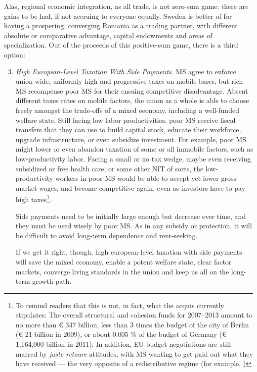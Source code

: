 Alas, regional economic integration, as all trade, is not zero-sum game: there are gains to be had, if not accruing to everyone equally. Sweden is better of for having a prospering, converging Romania as a trading partner, with different absolute or comparative advantage, capital endowments and areas of specialization. Out of the proceeds of this positive-sum game, there is a third option:
\begin{enumerate}
	\setcounter{enumi}{2}
	\item \emph{High European-Level Taxation With Side Payments.} \gls{MS} agree to enforce union-wide, uniformly high and progressive taxes on mobile bases, but rich \gls{MS} recompense poor \gls{MS} for their ensuing competitive disadvantage. Absent different taxes rates on mobile factors, the union as a whole is able to choose freely amongst the trade-offs of a mixed economy, including a well-funded welfare state. Still facing low labor productivities, poor \gls{MS} receive fiscal transfers that they can use to build capital stock, educate their workforce, upgrade infrastructure, or even subsidize investment. For example, poor \gls{MS} might lower or even abandon taxation of some or all immobile factors, such as low-productivity labor. Facing a small or no tax wedge, maybe even receiving subsidized or free health care, or some other \gls{NIT} of sorts, the low-productivity workers in poor \gls{MS} would be able to accept yet lower gross market wages, and become competitive again, even as investors have to pay high taxes\footnote{
		To remind readers that this is not, in fact, what the acquis currently stipulates: The overall structural and cohesion funds for 2007--2013 amount to no more than \euro{} 347 billion, less than 3 times the budget of the city of Berlin (\euro{} 21 billion in 2009), or about 0.005 \% of the budget of Germany (\euro{} 1,164,000 billion in 2011). In addition, \gls{EU} budget negotiations are still marred by \emph{juste retoure} attitudes, with \gls{MS} wanting to get paid out what they have received --- the very opposite of a redistributive regime (for example, \citealt{Begg2008a})}.
	
	Side payments need to be initially large enough but decrease over time, and they must be used wisely by poor \gls{MS}. As in any subsidy or  protection, it will be difficult to avoid long-term dependence and rent-seeking.
	
	If we get it right, though, high european-level taxation with side payments will save the mixed economy, enable a potent welfare state, clear factor markets, converge living standards in the union and keep us all on the long-term growth path. 
\end{enumerate}

